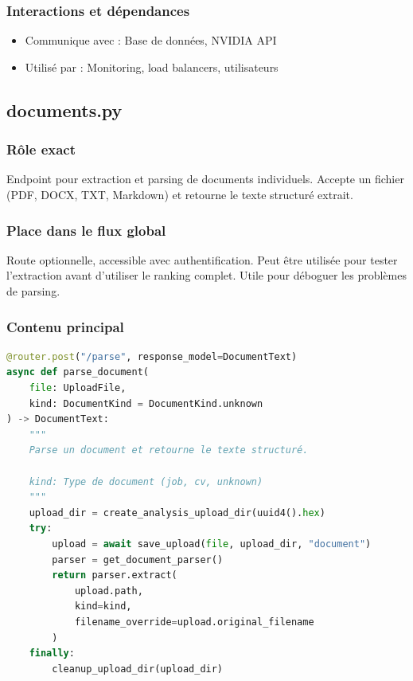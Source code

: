 \documentclass[12pt,a4paper,oneside]{book}
\begin{document}
\subsubsection{Interactions et dépendances}

\begin{itemize}
    \item Communique avec : Base de données, NVIDIA API
    \item Utilisé par : Monitoring, load balancers, utilisateurs
\end{itemize}

\subsection{documents.py}

\subsubsection{Rôle exact}

Endpoint pour extraction et parsing de documents individuels. Accepte un fichier (PDF, DOCX, TXT, Markdown) et retourne le texte structuré extrait.

\subsubsection{Place dans le flux global}

Route optionnelle, accessible avec authentification. Peut être utilisée pour tester l'extraction avant d'utiliser le ranking complet. Utile pour déboguer les problèmes de parsing.

\subsubsection{Contenu principal}

\begin{lstlisting}[language=Python]
@router.post("/parse", response_model=DocumentText)
async def parse_document(
    file: UploadFile,
    kind: DocumentKind = DocumentKind.unknown
) -> DocumentText:
    """
    Parse un document et retourne le texte structuré.
    
    kind: Type de document (job, cv, unknown)
    """
    upload_dir = create_analysis_upload_dir(uuid4().hex)
    try:
        upload = await save_upload(file, upload_dir, "document")
        parser = get_document_parser()
        return parser.extract(
            upload.path,
            kind=kind,
            filename_override=upload.original_filename
        )
    finally:
        cleanup_upload_dir(upload_dir)
\end{lstlisting}
\end{document}
